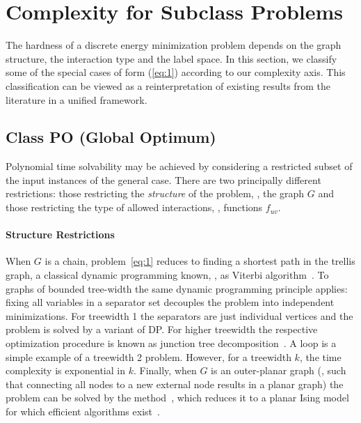 \section{Complexity for Subclass Problems} \label{sec:specialcases}

The hardness of a discrete energy minimization problem depends on the graph structure, the interaction type and the label space. In this section, we classify some of the special cases of form (\ref{eq:1}) according to our complexity axis. This classification can be viewed as a reinterpretation of existing results from the literature in a unified framework.

\subsection{Class PO (Global Optimum)}
Polynomial time solvability may be achieved by considering a restricted subset of the input instances of the general case. There are two principally different restrictions: those restricting the {\em structure} of the problem, \ie, the graph $G$ and those restricting the type of allowed interactions, \ie, functions $f_{uv}$.
\paragraph{Structure Restrictions} When $G$ is a chain, problem~\eqref{eq:1} reduces to finding a shortest path in the trellis graph, a classical dynamic programming known, \eg, as Viterbi algorithm~\cite{wikipedia}. %
To graphs of bounded tree-width the same dynamic programming principle applies: fixing all variables in a separator set decouples the problem into independent minimizations. For treewidth 1 the separators are just individual vertices and the problem is solved by a variant of DP. For higher treewidth the respective optimization procedure is known as junction tree decomposition~\cite{Lauritzen96}. A loop is a simple example of a treewidth 2 problem. However, for a treewidth $k$, the time complexity is exponential in $k$. Finally, when $G$ is an outer-planar graph (\ie, such that connecting all nodes to a new external node results in a planar graph) the problem can be solved by the method~\cite{Schraudolph-10}, which reduces it to a planar Ising model for which efficient algorithms exist~\cite{Shih-90}.
%
